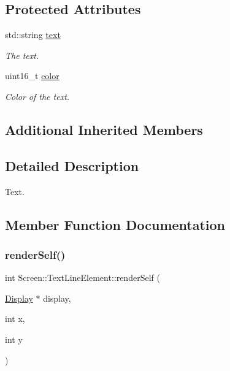 \subsection*{Protected Attributes}
\begin{DoxyCompactItemize}
\item 
\mbox{\label{classScreen_1_1TextLineElement_ad2495931e2dd28b0d7cb5d8c761dedad}} 
std\+::string \mbox{\hyperlink{classScreen_1_1TextLineElement_ad2495931e2dd28b0d7cb5d8c761dedad}{text}}
\begin{DoxyCompactList}\small\item\em The text. \end{DoxyCompactList}\item 
\mbox{\label{classScreen_1_1TextLineElement_ac4fa4d52ead8e4b38ba18c673875fae2}} 
uint16\+\_\+t \mbox{\hyperlink{classScreen_1_1TextLineElement_ac4fa4d52ead8e4b38ba18c673875fae2}{color}}
\begin{DoxyCompactList}\small\item\em Color of the text. \end{DoxyCompactList}\end{DoxyCompactItemize}
\subsection*{Additional Inherited Members}


\subsection{Detailed Description}
Text. 

\subsection{Member Function Documentation}
\mbox{\label{classScreen_1_1TextLineElement_abcd2e0700f84bb19d7a285345cd37871}} 
\subsubsection{\texorpdfstring{render\+Self()}{renderSelf()}}
{\footnotesize\ttfamily int Screen\+::\+Text\+Line\+Element\+::render\+Self (\begin{DoxyParamCaption}\item[{\mbox{\hyperlink{classDisplay}{Display}} $\ast$}]{display,  }\item[{int}]{x,  }\item[{int}]{y }\end{DoxyParamCaption})\hspace{0.3cm}{\ttfamily [virtual]}}



